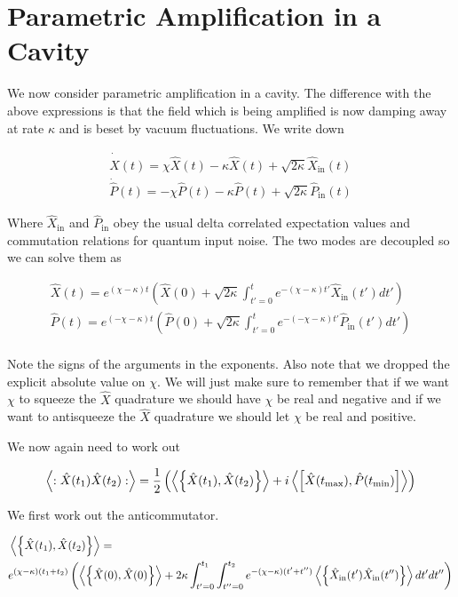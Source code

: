 \documentclass[12pt]{article}
\begin{document}
\section{Parametric Amplification in a Cavity}

We now consider parametric amplification in a cavity. The difference with the above expressions is that the field which is being amplified is now damping away at rate $\kappa$ and is beset by vacuum fluctuations. We write down

\begin{align}
\dot{\hat{X}}(t) = \chi \hat{X}(t) - \kappa \hat{X}(t) + \sqrt{2\kappa}\hat{X}_{\text{in}}(t)\\
\dot{\hat{P}}(t) = -\chi \hat{P}(t) - \kappa \hat{P}(t) + \sqrt{2\kappa}\hat{P}_{\text{in}}(t)
\end{align}

Where $\hat{X}_{\text{in}}$ and $\hat{P}_{\text{in}}$ obey the usual delta correlated expectation values and commutation relations for quantum input noise.
The two modes are decoupled so we can solve them as

\begin{align}
\hat{X}(t) = e^{(\chi - \kappa)t}\left(\hat{X}(0) + \sqrt{2\kappa} \int_{t'=0}^t e^{-(\chi-\kappa)t'}\hat{X}_{\text{in}}(t') dt'\right)\\
\hat{P}(t) = e^{(-\chi - \kappa)t}\left(\hat{P}(0) + \sqrt{2\kappa} \int_{t'=0}^t e^{-(-\chi-\kappa)t'}\hat{P}_{\text{in}}(t') dt'\right)\\
\end{align}

Note the signs of the arguments in the exponents. Also note that we dropped the explicit absolute value on $\chi$. We will just make sure to remember that if we want $\chi$ to squeeze the $\hat{X}$ quadrature we should have $\chi$ be real and negative and if we want to antisqueeze the $\hat{X}$ quadrature we should let $\chi$ be real and positive.

We now again need to work out

\begin{align}
\Braket{:\hat{X}(t_1)\hat{X}(t_2) :} = \frac{1}{2}\left(\Braket{\left\{\hat{X}(t_1),\hat{X}(t_2) \right\}} + i \Braket{\left[\hat{X}(t_\text{max}),\hat{P}(t_{\text{min}}) \right]} \right)
\end{align}

We first work out the anticommutator.

\begin{align}
&\Braket{\left\{\hat{X}(t_1),\hat{X}(t_2) \right\}} =\\
& e^{(\chi - \kappa)(t_1 + t_2)}\left(\Braket{\left\{\hat{X}(0),\hat{X}(0)\right\}} + 2\kappa \int_{t'=0}^{t_1} \int_{t''=0}^{t_2} e^{-(\chi-\kappa)(t'+t'')}\Braket{\left\{\hat{X}_{\text{in}}(t')\hat{X}_{\text{in}}(t'')\right\}}dt'dt''\right)
\end{align}
\end{document}
